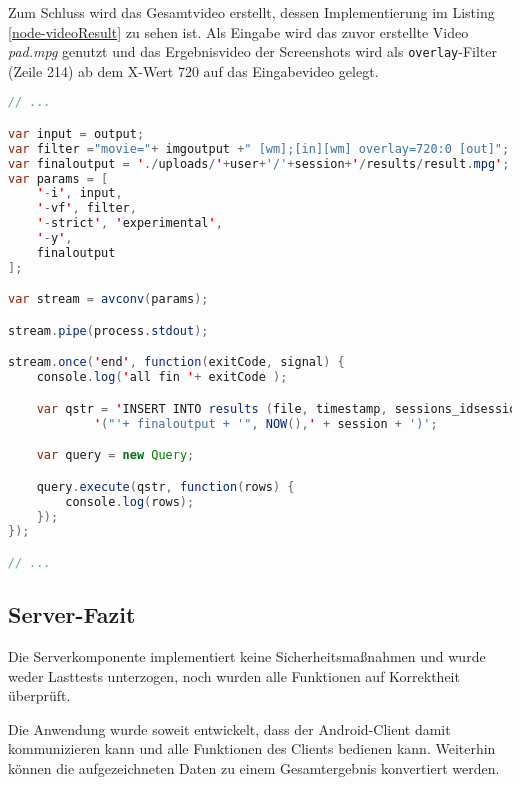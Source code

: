 Zum Schluss wird das Gesamtvideo erstellt, dessen Implementierung im Listing \ref{node-videoResult} zu sehen ist. 
Als Eingabe wird das zuvor erstellte Video \emph{pad.mpg} genutzt und das Ergebnisvideo der Screenshots wird als \texttt{overlay}-Filter (Zeile 214) ab dem X-Wert 720 auf das Eingabevideo gelegt.

\begin{lstlisting}[label=node-videoResult,language=Java, caption=Gesamtvideo kombinieren, firstnumber=211]
// ...

var input = output;
var filter ="movie="+ imgoutput +" [wm];[in][wm] overlay=720:0 [out]";
var finaloutput = './uploads/'+user+'/'+session+'/results/result.mpg';
var params = [
	'-i', input,
	'-vf', filter,
	'-strict', 'experimental',
	'-y',
	finaloutput
];

var stream = avconv(params);

stream.pipe(process.stdout);

stream.once('end', function(exitCode, signal) {
	console.log('all fin '+ exitCode );

	var qstr = 'INSERT INTO results (file, timestamp, sessions_idsessions) VALUES ' +
			'("'+ finaloutput + '", NOW(),' + session + ')';

	var query = new Query;

	query.execute(qstr, function(rows) {
		console.log(rows);
	});
});

// ...
\end{lstlisting}

\subsection{Server-Fazit \label{sec:server-fazit}}

Die Serverkomponente implementiert keine Sicherheitsmaßnahmen und wurde weder Lasttests unterzogen, noch wurden alle Funktionen auf Korrektheit überprüft.

Die Anwendung wurde soweit entwickelt, dass der Android-Client damit kommunizieren kann und alle Funktionen des Clients bedienen kann.
Weiterhin können die aufgezeichneten Daten zu einem Gesamtergebnis konvertiert werden.